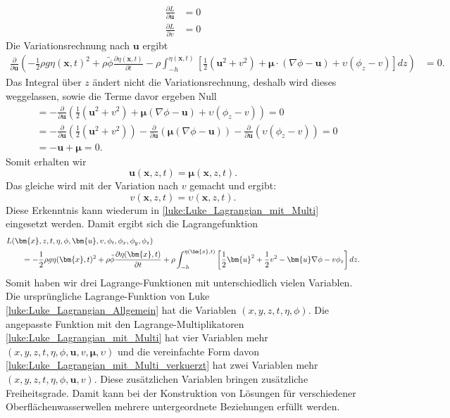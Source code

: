 \begin{align*}
\frac{\partial L}{\partial \bm{u}} &= 0
\\
\frac{\partial L}{\partial v} &= 0
\end{align*}
Die Variationsrechnung nach $\bm{u}$ ergibt
\begin{align*}
	\frac{\partial \mathscr{}}{\partial \bm{u}}\left( -\frac{1}{2} \rho g \eta(\bm{x},t)^2 + \rho\tilde{\phi} \frac{\partial\eta(\bm{x},t)}{\partial t} -\rho \int_{-h}^{\eta(\bm{x},t)} \left[ \frac{1}{2} (\bm{u}^2 + v^2) + \bm{\mu} \cdot (\nabla\phi - \bm{u}) + \upsilon \left(\phi_z - v\right) \right] dz\right)
	&= 0.
\end{align*}
Das Integral über $z$ ändert nicht die Variationsrechnung, deshalb wird dieses weggelassen, sowie die Terme davor ergeben Null
\begin{align*}
	&= -\frac{\partial}{\partial \bm{u}} \left(\frac{1}{2} (\bm{u}^2 + v^2) + \bm{\mu} (\nabla\phi - \bm{u}) + \upsilon \left(\phi_z - v\right) \right) = 0
	\\
	&= -\frac{\partial}{\partial \bm{u}} \left( \frac{1}{2} (\bm{u}^2 + v^2) \right)  -\frac{\partial}{\partial \bm{u}} \left( \bm{\mu} (\nabla\phi - \bm{u}) \right)  -\frac{\partial}{\partial \bm{u}} \left( \upsilon \left(\phi_z - v\right) \right) = 0
	\\
	&=
	-\bm{u}
	+\bm{\mu}
	= 0.
\end{align*}
Somit erhalten wir
\begin{equation}
	\bm{u}(\bm{x},z,t) = \bm{\mu}(\bm{x},z,t).
\end{equation}
Das gleiche wird mit der Variation nach $v$ gemacht und ergibt:
\begin{equation}
	v(\bm{x},z,t) = \upsilon(\bm{x},z,t).
\end{equation}
Diese Erkenntnis kann wiederum in \eqref{luke:Luke_Lagrangian_mit_Multi} eingesetzt werden.
Damit ergibt sich die Lagrangefunktion
\begin{align}
&L(\bm{x},z,t,\eta,\phi,\bm{u}, v,\phi_t,\phi_x, \phi_y, \phi_z)
\notag
\\
&\qquad=
	-
	\frac{1}{2}\rho g \eta(\bm{x},t)^2
	+
	\rho\tilde{\phi} \frac{\partial\eta(\bm{x},t)}{\partial t}
	+
	\rho\int_{-h}^{\eta(\bm{x},t)} \left[ \frac{1}{2} \bm{u}^2 + \frac{1}{2} v^2 - \bm{u} \nabla \phi - v \phi_z \right] dz.
	\label{luke:Luke_Lagrangian_mit_Multi_verkuerzt}
\end{align}
Somit haben wir drei Lagrange-Funktionen mit unterschiedlich vielen Variablen.
Die ursprüngliche Lagrange-Funktion von Luke \eqref{luke:Luke_Lagrangian_Allgemein} hat die Variablen $(x,y,z,t,\eta,\phi)$.
Die angepasste Funktion mit den Lagrange-Multiplikatoren \eqref{luke:Luke_Lagrangian_mit_Multi} hat vier Variablen mehr $(x,y,z,t,\eta,\phi,\bm{u},v,\bm{\mu},\upsilon)$ und die vereinfachte Form davon \eqref{luke:Luke_Lagrangian_mit_Multi_verkuerzt} hat zwei Variablen mehr $(x,y,z,t,\eta,\phi,\bm{u},v)$.
Diese zusätzlichen Variablen bringen zusätzliche Freiheitsgrade.
Damit kann bei der Konstruktion von Lösungen für verschiedener Oberflächenwasserwellen mehrere untergeordnete Beziehungen erfüllt werden.

